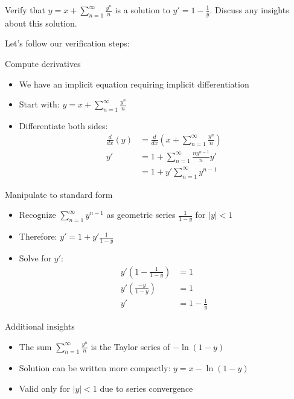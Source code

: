 \exampleline
\begin{example}
Verify that $y = x + \sum_{n=1}^{\infty} \frac{y^n}{n}$ is a solution to $y' = 1-\frac{1}{y}$. Discuss any insights about this solution.

\begin{solution}
Let's follow our verification steps:

\item Compute derivatives
  \begin{itemize}
     \item We have an implicit equation requiring implicit differentiation
     \item Start with: $y = x + \sum_{n=1}^{\infty} \frac{y^n}{n}$
     \item Differentiate both sides:
       \begin{align*}
       \frac{d}{dx}(y) &= \frac{d}{dx}\left(x + \sum_{n=1}^{\infty} \frac{y^n}{n}\right) \\
       y' &= 1 + \sum_{n=1}^{\infty} \frac{ny^{n-1}}{n}y' \\
       &= 1 + y'\sum_{n=1}^{\infty} y^{n-1}
       \end{align*}
  \end{itemize}

\item Manipulate to standard form
  \begin{itemize}
     \item Recognize $\sum_{n=1}^{\infty} y^{n-1}$ as geometric series $\frac{1}{1-y}$ for $|y| < 1$
     \item Therefore: $y' = 1 + y'\frac{1}{1-y}$
     \item Solve for $y'$:
       \begin{align*}
       y'\left(1 - \frac{1}{1-y}\right) &= 1 \\
       y'\left(\frac{-y}{1-y}\right) &= 1 \\
       y' &= 1 - \frac{1}{y}
       \end{align*}
  \end{itemize}

\item Additional insights
  \begin{itemize}
     \item The sum $\sum_{n=1}^{\infty} \frac{y^n}{n}$ is the Taylor series of $-\ln(1-y)$
     \item Solution can be written more compactly: $y = x - \ln(1-y)$
     \item Valid only for $|y| < 1$ due to series convergence
  \end{itemize}
\end{solution}
\end{example}
\exampleline

